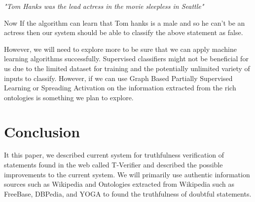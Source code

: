 \documentclass[11pt]{article}
\begin{document}
\emph{"Tom Hanks was the lead actress in the movie sleepless in Seattle"}

Now If the algorithm can learn that Tom hanks is a male and so he can't be an actress then our system should be able to classify the above statement as false. 

However, we will need to explore more to be sure that we can apply machine learning algorithms successfully. Supervised classifiers might not be beneficial for us due to the limited dataset for training and the potentially unlimited variety of inputs to classify. However, if we can use Graph Based Partially Supervised Learning\cite{conf/acl/CelikyilmazTH09} or Spreading Activation \cite{Cohen1987255} on the information extracted from the rich ontologies is something we plan to explore.


\section{Conclusion}
It this paper, we described current system for truthfulness verification of statements found in the web called T-Verifier and described the possible improvements to the current system. We will primarily use authentic information sources such as Wikipedia and Ontologies extracted from Wikipedia such as FreeBase, DBPedia, and YOGA to found the truthfulness of doubtful statements.  




\end{document}
